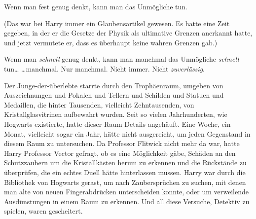 \later

Wenn man fest genug denkt, kann man das Unmögliche tun.

(Das war bei Harry immer ein Glaubensartikel gewesen. Es hatte eine Zeit gegeben, in der er die Gesetze der Physik als ultimative Grenzen anerkannt hatte, und jetzt vermutete er, dass es überhaupt keine wahren Grenzen gab.)




Wenn man \emph{schnell} genug denkt, kann man manchmal das Unmögliche \emph{schnell} tun…
…manchmal. Nur manchmal. Nicht immer. Nicht \emph{zuverlässig}.

Der Junge-der-überlebte starrte durch den Trophäenraum, umgeben von Auszeichnungen und Pokalen und Tellern und Schilden und Statuen und Medaillen, die hinter Tausenden, vielleicht Zehntausenden, von Kristallglasvitrinen aufbewahrt wurden. Seit so vielen Jahrhunderten, wie Hogwarts existierte, hatte dieser Raum Details angehäuft. Eine Woche, ein Monat, vielleicht sogar ein Jahr, hätte nicht ausgereicht, um jeden Gegenstand in diesem Raum zu untersuchen. Da Professor Flitwick nicht mehr da war, hatte Harry Professor Vector gefragt, ob es eine Möglichkeit gäbe, Schäden an den Schutzzaubern um die Kristallkästen herum zu erkennen und die Rückstände zu überprüfen, die ein echtes Duell hätte hinterlassen müssen. Harry war durch die Bibliothek von Hogwarts gerast, um nach Zaubersprüchen zu suchen, mit denen man alte von neuen Fingerabdrücken unterscheiden konnte, oder um verweilende Ausdünstungen in einem Raum zu erkennen. Und all diese Versuche, Detektiv zu spielen, waren gescheitert.

